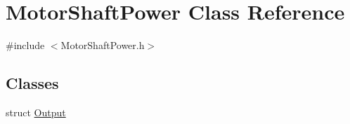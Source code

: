 \hypertarget{class_motor_shaft_power}{}\section{Motor\+Shaft\+Power Class Reference}
\label{class_motor_shaft_power}


{\ttfamily \#include $<$Motor\+Shaft\+Power.\+h$>$}

\subsection*{Classes}
\begin{DoxyCompactItemize}
\item 
struct \hyperlink{struct_motor_shaft_power_1_1_output}{Output}
\end{DoxyCompactItemize}
